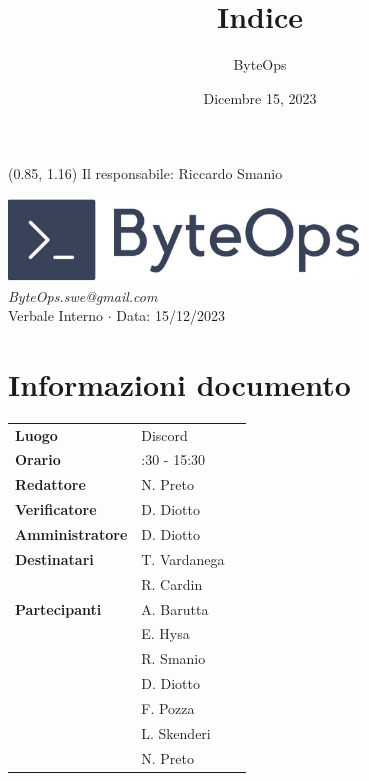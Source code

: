 \documentclass{article}
\title{\textbf{\fontsize{28}{6}\selectfont Indice}}
\author{\fontsize{14}{6}\selectfont ByteOps}
\date{Dicembre 15, 2023}
\begin{document}
\begin{textblock*}{\textwidth}(0.85\textwidth, 1.16\textheight)
    Il responsabile: Riccardo Smanio
\end{textblock*}

\pagestyle{fancy}
\begin{center}
\includegraphics[width = 0.7\textwidth]{../../../Images/logo.png} \\
\vspace{0.2cm}
\textcolor[RGB]{60, 60, 60}{\textit{ByteOps.swe@gmail.com}} \\
\vspace{1cm}
\fontsize{16}{6}\selectfont Verbale Interno $\cdot$ Data: 15/12/2023 \\
\vspace{0.5cm}
\end{center}

\section*{Informazioni documento}
\def\arraystretch{1.2}
\begin{tabular}{>{\raggedleft\arraybackslash}p{}|>{\raggedright\arraybackslash}p{}c}
\hline
\addlinespace
\textbf{Luogo} & Discord \vspace{10pt} \\
\textbf{Orario} & 14:30 - 15:30 \vspace{10pt} \\
\textbf{Redattore} & N. Preto \vspace{10pt} \\
\textbf{Verificatore} & D. Diotto \vspace{10pt} \\
\textbf{Amministratore} & D. Diotto \vspace{10pt} \\
\textbf{Destinatari} & T. Vardanega \\ & R. Cardin \vspace{10pt} \\
\textbf{Partecipanti} & A. Barutta \\ & E. Hysa \\ & R. Smanio \\ & D. Diotto \\ & F. Pozza \\ & L. Skenderi \\ & N. Preto \vspace{10pt} \\
\end{tabular}
\pagebreak 
\end{document}
